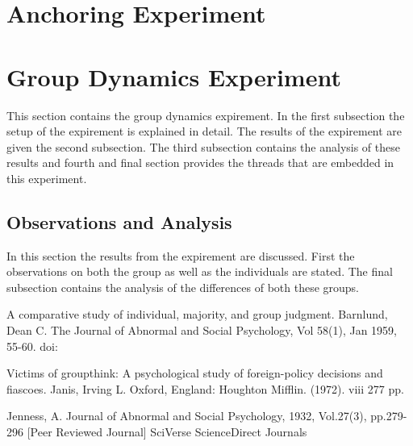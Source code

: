 \documentclass{article}
\begin{document}
\section{Anchoring Experiment}



\section{Group Dynamics Experiment}
This section contains the group dynamics expirement. In the first subsection the setup of the expirement is explained in detail. The results of the expirement are given the second subsection. The third subsection contains the analysis of these results and fourth and final section provides the threads that are embedded in this experiment.

\subsection{Observations and Analysis}
In this section the results from the expirement are discussed. First the observations on both the group as well as the individuals are stated. The final subsection contains the analysis of the differences of both these groups.




\begin{thebibliography}{30}

 A comparative study of individual, majority, and group judgment.
Barnlund, Dean C.
The Journal of Abnormal and Social Psychology, Vol 58(1), Jan 1959, 55-60. doi:

 Victims of groupthink: A psychological study of foreign-policy decisions and fiascoes.
Janis, Irving L.
Oxford, England: Houghton Mifflin. (1972). viii 277 pp.

 Jenness, A. Journal of Abnormal and Social Psychology, 1932, Vol.27(3), pp.279-296 [Peer Reviewed Journal]
SciVerse ScienceDirect Journals
\end{thebibliography}
\end{document}
